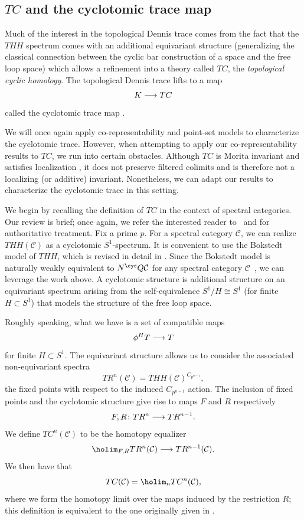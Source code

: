 \documentclass{amsart}
\renewcommand{\to}{\mathchoice{\longrightarrow}{\rightarrow}{\rightarrow}{\rightarrow}}
\let\catsymbfont\mathcal
\newcommand{\aC}{{\catsymbfont{C}}}
\numberwithin{equation}{section}
\theoremstyle{definition}
\begin{document}
\subsection{$TC$ and the cyclotomic trace map}
Much of the interest in the topological Dennis trace comes from the
fact that the $THH$ spectrum comes with an additional equivariant
structure (generalizing the classical connection between the cyclic
bar construction of a space and the free loop space) which allows a
refinement into a theory called $TC$, the {\em topological cyclic homology}.
The topological Dennis trace lifts to a map
\[
K \to TC
\]
called the cyclotomic trace map \cite{BokstedtHsiangMadsen}.


We will once again apply co-representability and point-set models to
characterize the cyclotomic trace.  However, when attempting to apply
our co-representability results to $TC$, we run into certain
obstacles.  Although $TC$ is Morita invariant and satisfies
localization \cite{BM}, it does not preserve filtered colimits and is
therefore not a localizing (or additive) invariant.  Nonetheless, we
can adapt our results to characterize the cyclotomic trace in this
setting.

We begin by recalling the definition of $TC$ in the context of
spectral categories.  Our review is brief; once again, we refer the
interested reader to~\cite[\S 5]{BM2} and \cite[\S 4]{BM} for
authoritative treatment.  Fix a prime $p$.  For a spectral category 
$\aC$, we can realize $THH(\aC)$ as a cyclotomic $S^1$-spectrum.  It is convenient to use the Bokstedt model of $THH$, which is revised in
detail in \cite[\S 4]{BM}.  Since the Bokstedt model is naturally
weakly equivalent to $N^{\cyc} Q\aC$ for any spectral category
$\aC$~\cite[3.1]{BM}, we can leverage the work above.  A cyclotomic
structure is additional structure on an equivariant spectrum arising
from the self-equivalence $S^1 / H \cong S^1$ (for finite $H \subset
S^1$) that models the structure of the free loop space.

Roughly speaking, what we have is a set of compatible maps
\[
\phi^H T \to T
\]
for finite $H \subset S^1$.  The equivariant structure allows us to
consider the associated non-equivariant spectra
\[
TR^n(\aC) = THH(\aC)^{C_{p^{n-1}}},
\]
the fixed points with respect to the induced $C_{p^{n-1}}$ action.
The inclusion of fixed points and the cyclotomic structure give rise
to maps $F$ and $R$ respectively
\[
F,R\colon TR^n \to TR^{n-1}.
\]
We define $TC^{n}(\aC)$ to be the homotopy equalizer 
\[
\holim_{F,R} TR^n(\aC) \to TR^{n-1}(\aC).\]
We then have that
\[
TC(\aC) = \holim_n TC^n (\aC),
\]
where we form the homotopy limit over the maps induced by the
restriction $R$; this definition is equivalent to the one originally
given in \cite{BokstedtHsiangMadsen}.
\end{document}
